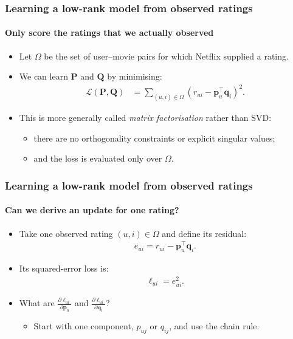 \documentclass[]{article}
\begin{document}
\begin{frame}
\frametitle{Learning a low-rank model from observed ratings}
\framesubtitle{Only score the ratings that we actually observed}
\begin{itemize}
	\item<+-> Let $\Omega$ be the set of user--movie pairs for which Netflix supplied a rating.
	\item<+-> We can learn $\bm P$ and $\bm Q$ by minimising:
	\begin{align*}
		\mathcal{L}(\bm P,\bm Q)
		&=\sum_{(u,i)\in\Omega}
		\left(r_{ui}-\bm p_u^\top\bm q_i\right)^2.
	\end{align*}
	\item<+-> This is more generally called \emph{matrix factorisation} rather than SVD:
	\begin{itemize}
		\item<+-> there are no orthogonality constraints or explicit singular values;
		\item<+-> and the loss is evaluated only over $\Omega$.
	\end{itemize}
\end{itemize}
\end{frame}


\begin{frame}
\frametitle{Learning a low-rank model from observed ratings}
\framesubtitle{Can we derive an update for one rating?}
\begin{itemize}
	\item<+-> Take one observed rating $(u,i)\in\Omega$ and define its residual:
	\begin{align*}
		e_{ui}=r_{ui}-\bm p_u^\top\bm q_i.
	\end{align*}
	\item<+-> Its squared-error loss is:
	\begin{align*}
		\ell_{ui}=e_{ui}^2.
	\end{align*}
	\item<+-> What are $\frac{\partial\ell_{ui}}{\partial\bm p_u}$ and $\frac{\partial\ell_{ui}}{\partial\bm q_i}$?
	\begin{itemize}
		\item<+-> Start with one component, $p_{uj}$ or $q_{ij}$, and use the chain rule.
	\end{itemize}
\end{itemize}
\end{frame}
\end{document}

